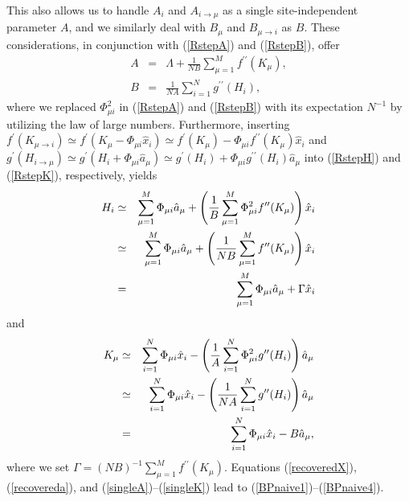 \documentclass[12pt]{iopart}
\begin{document}
This also allows us to handle $A_i$ and $A_{i \to \mu}$ as a single site-independent parameter $A$, and we similarly deal with $B_\mu $ and $B_{\mu \to i}$ as $B$. These considerations, in conjunction with (\ref{RstepA}) and (\ref{RstepB}), offer 
\begin{eqnarray}
A&=&\Lambda+\frac{1}{NB} \sum_{\mu=1}^M f^{\prime \prime}(K_\mu ), 
\label{singleA}\\
B&=& \frac{1}{NA}\sum_{i=1}^N g^{\prime \prime}(H_i), 
\label{singleB}
\end{eqnarray}
where we replaced $\Phi_{\mu i}^2$ in (\ref{RstepA}) and (\ref{RstepB}) with its expectation $N^{-1}$ by utilizing the law of large numbers. Furthermore, inserting $f^{\prime}(K_{\mu \to i}) \simeq f^{\prime}(K_\mu-\Phi_{\mu i}\hat{x}_i) \simeq f^{\prime}(K_\mu)-\Phi_{\mu i} f^{\prime \prime}(K_\mu) \hat{x}_i$ and $g^{\prime}(H_{i \to \mu}) \simeq g^{\prime}(H_i+ \Phi_{\mu i} \hat{a}_\mu ) \simeq g^{\prime}(H_i)+\Phi_{\mu i} g^{\prime \prime}(H_i) \hat{a}_\mu$ into (\ref{RstepH}) and (\ref{RstepK}), respectively, yields
\begin{eqnarray}
H_i &\simeq&\sum_{\mu=1 }^M \Phi_{\mu i} \hat{a}_\mu + \left (\frac{1}{B}\sum_{\mu=1}^M 
\Phi_{\mu i}^2 f^{\prime \prime}(K_\mu) \right ) \hat{x}_i \cr
&\simeq &\sum_{\mu=1 }^M \Phi_{\mu i} \hat{a}_\mu + \left (\frac{1}{NB}\sum_{\mu=1}^M 
 f^{\prime \prime}(K_\mu) \right ) \hat{x}_i 
\cr
&=& \sum_{\mu=1 }^M \Phi_{\mu i} \hat{a}_\mu + \Gamma \hat{x}_i 
\label{singleH}
\end{eqnarray}
and
\begin{eqnarray}
K_\mu &\simeq& \sum_{i=1}^N \Phi_{\mu i} \hat{x}_i -\left (\frac{1}{A}\sum_{i=1}^N \Phi_{\mu i}^2 
g^{\prime \prime} (H_i) \right )\hat{a}_\mu \cr
&\simeq & \sum_{i=1}^N \Phi_{\mu i} \hat{x}_i -\left (\frac{1}{N A}\sum_{i=1}^N  
g^{\prime \prime} (H_i) \right )\hat{a}_\mu \cr
&=& \sum_{i=1}^N \Phi_{\mu i} \hat{x}_i -B \hat{a}_\mu , 
\label{singleK}
\end{eqnarray}
where we set $\Gamma=(NB)^{-1}\sum_{\mu=1}^M f^{\prime \prime}(K_\mu)$. Equations (\ref{recoveredX}), (\ref{recovereda}), and (\ref{singleA})--(\ref{singleK}) lead to (\ref{BPnaive1})--(\ref{BPnaive4}). 
\end{document}
